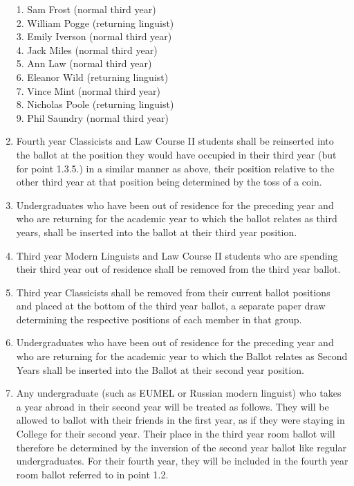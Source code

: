 \begin{enumerate}
1. Sam Frost (normal third year)\\
2. William Pogge (returning linguist)\\
3. Emily Iverson (normal third year)\\
4. Jack Miles (normal third year)\\
5. Ann Law (normal third year)\\
6. Eleanor Wild (returning linguist)\\
7. Vince Mint (normal third year)\\
8. Nicholas Poole (returning linguist)\\
9. Phil Saundry (normal third year)\\
\item Fourth year Classicists and Law Course II students shall be reinserted into the ballot at the position they would have occupied in their third year (but for point 1.3.5.) in a similar manner as above, their position relative to the other third year at that position being determined by the toss of a coin.
\item Undergraduates who have been out of residence for the preceding year and who are returning for the academic year to which the ballot relates as third years, shall be inserted into the ballot at their third year position.
\item \label{AppP:RoomLinguist} Third year Modern Linguists and Law Course II students who are spending their third year out of residence shall be removed from the third year ballot.
\item \label{AppP:RoomClassicist} Third year Classicists shall be removed from their current ballot positions and placed at the bottom of the third year ballot, a separate paper draw determining the respective positions of each member in that group.
\item Undergraduates who have been out of residence for the preceding year and who are returning for the academic year to which the Ballot relates as Second Years shall be inserted into the Ballot at their second year position.
\item Any undergraduate (such as EUMEL or Russian modern linguist) who takes a year abroad in their second year will be treated as follows. They will be allowed to ballot with their friends in the first year, as if they were staying in College for their second year. Their place in the third year room ballot will therefore be determined by the inversion of the second year ballot like regular undergraduates. For their fourth year, they will be included in the fourth year room ballot referred to in point 1.2.

\end{enumerate}
